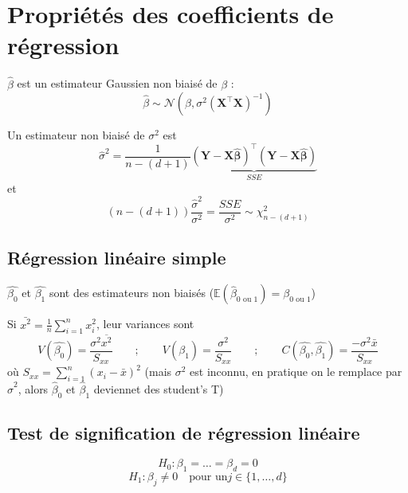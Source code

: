 \documentclass[12pt,a4paper]{article}
\begin{document}
\section{Propriétés des coefficients de régression}

$\hat{\beta}$ est un estimateur Gaussien non biaisé de $\beta$ :
$$\hat{\beta} \sim \mathcal{N}\left(\beta, \sigma^2 \left(\mathbf{X}^\top \mathbf{X}\right)^{-1}\right)$$

Un estimateur non biaisé de $\sigma^2$ est
$$\hat{\sigma}^2 = \frac{1}{n-(d+1)} \underbrace{\left( \mathbf{Y} - \mathbf{X}\hat{\boldsymbol{\beta}} \right)^\top \left( \mathbf{Y} - \mathbf{X}\hat{\boldsymbol{\beta}} \right)}_{SSE}$$
et
$$(n-(d+1))\frac{\hat{\sigma}^2}{\sigma^2} = \frac{SSE}{\sigma^2} \sim \chi^2_{n-(d+1)}$$


\subsection{Régression linéaire simple}

$\hat{\beta_0}$ et $\hat{\beta_1}$ sont des estimateurs non biaisés ($\mathbb{E}(\hat{\beta}_{0 \text{ ou } 1}) = \beta_{0 \text{ ou } 1}$)

Si $\bar{x^2} = \frac{1}{n} \sum_{i=1}^n x_i^2$, leur variances sont
$$ V(\hat{\beta_0}) = \frac{\sigma^2 \overline{x^2}}{S_{xx}} \qquad ; \qquad V(\hat{\beta_1}) = \frac{\sigma^2}{S_{xx}} \qquad ; \qquad C(\hat{\beta_0}, \hat{\beta_1}) = \frac{-\sigma^2 \bar{x}}{S_{xx}} $$
où $S_{xx} = \sum_{i=1}^n (x_i-\bar{x})^2$ (mais $\sigma^2$ est inconnu, en pratique on le remplace par $\hat{\sigma}^2$, alors $\hat{\beta}_0$ et $\hat{\beta}_1$ deviennet des student's T)

\subsection{Test de signification de régression linéaire}

$$H_0 : \beta_1 = \dots = \beta_d = 0$$
$$H_1 : \beta_j \neq 0 \quad \text{pour un} j \in \{1,\dots,d\}$$
\end{document}
